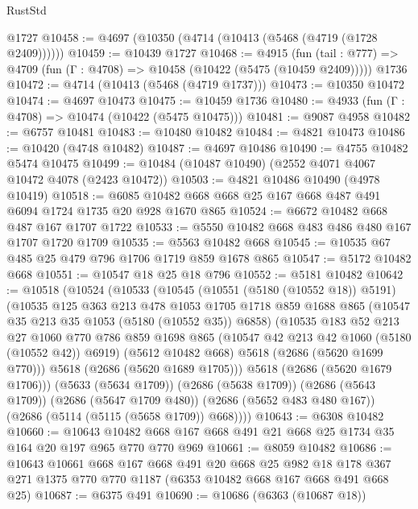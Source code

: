 \begin{lexlean}{RustStd}
\begin{coremodule}
    @1727
@10458 := @4697 (@10350 (@4714 (@10413 (@5468 (@4719 (@1728 @2409))))))
@10459 := @10439 @1727
@10468 := @4915
    (fun (tail : @777) => @4709 (fun (Γ : @4708) => @10458 (@10422 (@5475 (@10459 @2409)))))
    @1736
@10472 := @4714 (@10413 (@5468 (@4719 @1737)))
@10473 := @10350 @10472
@10474 := @4697 @10473
@10475 := @10459 @1736
@10480 := @4933 (fun (Γ : @4708) => @10474 (@10422 (@5475 @10475)))
@10481 := @9087 @4958
@10482 := @6757 @10481
@10483 := @10480 @10482
@10484 := @4821 @10473
@10486 := @10420 (@4748 @10482)
@10487 := @4697 @10486
@10490 := @4755 @10482 @5474 @10475
@10499 := @10484 (@10487 @10490) (@2552 @4071 @4067 @10472 @4078 (@2423 @10472))
@10503 := @4821 @10486 @10490 (@4978 @10419)
@10518 := @6085 @10482 @668 @668 @25 @167 @668 @487 @491 @6094 @1724 @1735 @20 @928 @1670 @865
@10524 := @6672 @10482 @668 @487 @167 @1707 @1722
@10533 := @5550 @10482 @668 @483 @486 @480 @167 @1707 @1720 @1709
@10535 := @5563 @10482 @668
@10545 := @10535 @67 @485 @25 @479 @796 @1706 @1719 @859 @1678 @865
@10547 := @5172 @10482 @668
@10551 := @10547 @18 @25 @18 @796
@10552 := @5181 @10482
@10642 := @10518
    (@10524
      (@10533
        (@10545
          (@10551 (@5180 (@10552 @18)) @5191)
          (@10535
            @125
            @363
            @213
            @478
            @1053
            @1705
            @1718
            @859
            @1688
            @865
            (@10547 @35 @213 @35 @1053 (@5180 (@10552 @35)) @6858)
            (@10535
              @183
              @52
              @213
              @27
              @1060
              @770
              @786
              @859
              @1698
              @865
              (@10547 @42 @213 @42 @1060 (@5180 (@10552 @42)) @6919)
              (@5612 @10482 @668)
              @5618
              (@2686 (@5620 @1699 @770)))
            @5618
            (@2686 (@5620 @1689 @1705)))
          @5618
          (@2686 (@5620 @1679 @1706)))
        (@5633 (@5634 @1709))
        (@2686 (@5638 @1709))
        (@2686 (@5643 @1709))
        (@2686 (@5647 @1709 @480))
        (@2686 (@5652 @483 @480 @167))
        (@2686 (@5114 (@5115 (@5658 @1709)) @668))))
@10643 := @6308 @10482
@10660 := @10643 @10482 @668 @167 @668 @491 @21 @668 @25 @1734 @35 @164 @20 @197 @965 @770 @770 @969
@10661 := @8059 @10482
@10686 := @10643
    @10661
    @668
    @167
    @668
    @491
    @20
    @668
    @25
    @982
    @18
    @178
    @367
    @271
    @1375
    @770
    @770
    @1187
    (@6353 @10482 @668 @167 @668 @491 @668 @25)
@10687 := @6375 @491
@10690 := @10686 (@6363 (@10687 @18))

\end{coremodule}
\end{lexlean}
